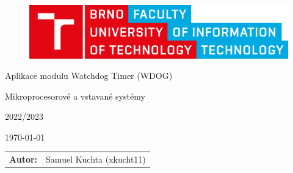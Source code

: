 \begin{titlepage}

\vspace*{2cm}
\begin{figure}[!h]
  \centering
  \includegraphics[width=13cm]{vut-fit-logo.pdf}
\end{figure}

\vfill

\begin{center}

\begin{Huge}
Aplikace modulu Watchdog Timer (WDOG) 
\end{Huge}

\bigskip

\begin{Large}
Mikroprocesorové a vstavané systémy
\end{Large}

\bigskip

\begin{Large}
	2022/2023
\end{Large}

\end{center}

\vfill

\begin{center}
\begin{Large}
\today
\end{Large}
\end{center}

\vfill

\begin{flushleft}
\begin{normalsize}
\begin{tabular}{ll}
\bf Autor: & Samuel Kuchta (xkucht11)
\end{tabular}
\end{normalsize}
\end{flushleft}
\end{titlepage}
